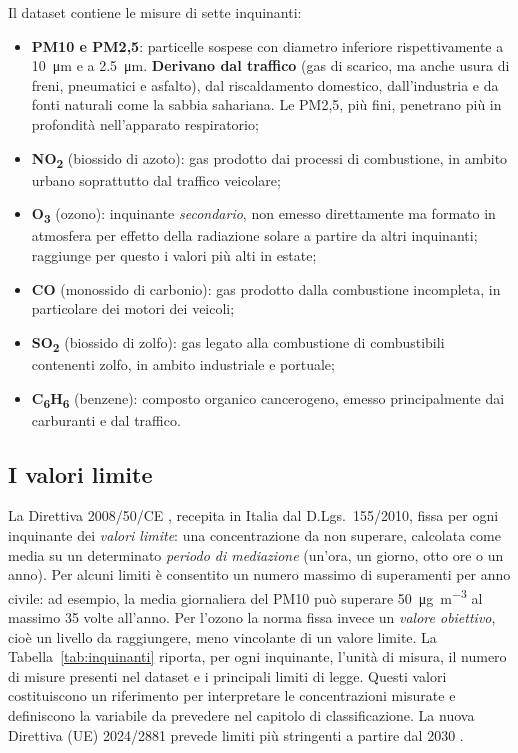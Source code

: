 \documentclass[11pt]{report}
\begin{document}
Il dataset contiene le misure di sette inquinanti:
\begin{itemize}
  \item \textbf{PM10 e PM2,5}: particelle sospese con diametro inferiore
        rispettivamente a \SI{10}{\micro\metre} e a \SI{2,5}{\micro\metre}.
        \textbf{Derivano dal traffico} (gas di scarico, ma anche usura di freni,
        pneumatici e asfalto), dal riscaldamento domestico, dall'industria e
        da fonti naturali come la sabbia sahariana. Le PM2,5, più fini,
        penetrano più in profondità nell'apparato respiratorio;
  \item \textbf{NO\textsubscript{2}} (biossido di azoto): gas prodotto dai
        processi di combustione, in ambito urbano soprattutto dal traffico
        veicolare;
  \item \textbf{O\textsubscript{3}} (ozono): inquinante \emph{secondario}, non
        emesso direttamente ma formato in atmosfera per effetto della radiazione
        solare a partire da altri inquinanti; raggiunge per questo i valori più
        alti in estate;
  \item \textbf{CO} (monossido di carbonio): gas prodotto dalla combustione
        incompleta, in particolare dei motori dei veicoli;
  \item \textbf{SO\textsubscript{2}} (biossido di zolfo): gas legato alla
        combustione di combustibili contenenti zolfo, in ambito industriale e
        portuale;
  \item \textbf{C\textsubscript{6}H\textsubscript{6}} (benzene): composto
        organico cancerogeno, emesso principalmente dai carburanti e dal
        traffico.
\end{itemize}

\subsection{I valori limite}

La Direttiva 2008/50/CE \cite{direttiva}, recepita in Italia dal D.Lgs.\
155/2010, fissa per ogni inquinante dei \emph{valori limite}: una
concentrazione da non superare, calcolata come media su un determinato
\emph{periodo di mediazione} (un'ora, un giorno, otto ore o un anno). Per
alcuni limiti è consentito un numero massimo di superamenti per anno civile: ad
esempio, la media giornaliera del PM10 può superare
\SI{50}{\micro\gram\per\cubic\metre} al massimo 35 volte all'anno. Per l'ozono
la norma fissa invece un \emph{valore obiettivo}, cioè un livello da
raggiungere, meno vincolante di un valore limite. La
Tabella~\ref{tab:inquinanti} riporta, per ogni inquinante, l'unità di misura,
il numero di misure presenti nel dataset e i principali limiti di legge. Questi
valori costituiscono un riferimento per interpretare le concentrazioni misurate
e definiscono la variabile da prevedere nel capitolo di classificazione. La
nuova Direttiva (UE) 2024/2881 prevede limiti più stringenti a partire dal 2030
\cite{direttiva2024}.
\end{document}
